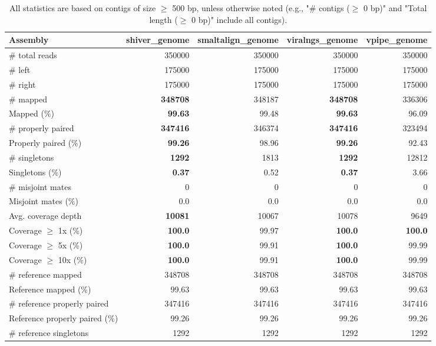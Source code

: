 \documentclass[12pt,a4paper]{article}
\begin{document}
\begin{table}[ht]
\begin{center}
\caption{All statistics are based on contigs of size $\geq$ 500 bp, unless otherwise noted (e.g., "\# contigs ($\geq$ 0 bp)" and "Total length ($\geq$ 0 bp)" include all contigs).}
\begin{tabular}{|l*{4}{|r}|}
\hline
Assembly & shiver\_genome & smaltalign\_genome & viralngs\_genome & vpipe\_genome \\ \hline
\# total reads & 350000 & 350000 & 350000 & 350000 \\ \hline
\# left & 175000 & 175000 & 175000 & 175000 \\ \hline
\# right & 175000 & 175000 & 175000 & 175000 \\ \hline
\# mapped & {\bf 348708} & 348187 & {\bf 348708} & 336306 \\ \hline
Mapped (\%) & {\bf 99.63} & 99.48 & {\bf 99.63} & 96.09 \\ \hline
\# properly paired & {\bf 347416} & 346374 & {\bf 347416} & 323494 \\ \hline
Properly paired (\%) & {\bf 99.26} & 98.96 & {\bf 99.26} & 92.43 \\ \hline
\# singletons & {\bf 1292} & 1813 & {\bf 1292} & 12812 \\ \hline
Singletons (\%) & {\bf 0.37} & 0.52 & {\bf 0.37} & 3.66 \\ \hline
\# misjoint mates & 0 & 0 & 0 & 0 \\ \hline
Misjoint mates (\%) & 0.0 & 0.0 & 0.0 & 0.0 \\ \hline
Avg. coverage depth & {\bf 10081} & 10067 & 10078 & 9649 \\ \hline
Coverage $\geq$ 1x (\%) & {\bf 100.0} & 99.97 & {\bf 100.0} & {\bf 100.0} \\ \hline
Coverage $\geq$ 5x (\%) & {\bf 100.0} & 99.91 & {\bf 100.0} & 99.99 \\ \hline
Coverage $\geq$ 10x (\%) & {\bf 100.0} & 99.91 & {\bf 100.0} & 99.99 \\ \hline
\# reference mapped & 348708 & 348708 & 348708 & 348708 \\ \hline
Reference mapped (\%) & 99.63 & 99.63 & 99.63 & 99.63 \\ \hline
\# reference properly paired & 347416 & 347416 & 347416 & 347416 \\ \hline
Reference properly paired (\%) & 99.26 & 99.26 & 99.26 & 99.26 \\ \hline
\# reference singletons & 1292 & 1292 & 1292 & 1292 \\ \hline

\end{tabular}
\end{center}
\end{table}
\end{document}
